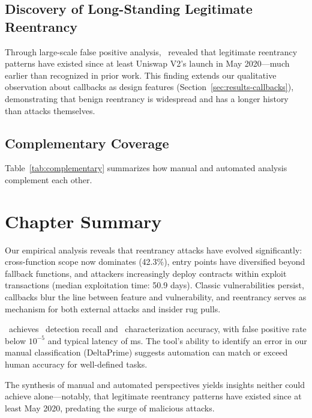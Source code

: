 \subsection{Discovery of Long-Standing Legitimate Reentrancy}

Through large-scale false positive analysis, \ToolName\ revealed that legitimate reentrancy patterns have existed since at least Uniswap V2's launch in May 2020---much earlier than recognized in prior work. This finding extends our qualitative observation about callbacks as design features (Section~\ref{sec:results-callbacks}), demonstrating that benign reentrancy is widespread and has a longer history than attacks themselves.

\subsection{Complementary Coverage}

Table~\ref{tab:complementary} summarizes how manual and automated analysis complement each other.



\section{Chapter Summary}
\label{sec:results-summary}

Our empirical analysis reveals that reentrancy attacks have evolved significantly: cross-function scope now dominates (42.3\%), entry points have diversified beyond fallback functions, and attackers increasingly deploy contracts within exploit transactions (median exploitation time: 50.9 days). Classic vulnerabilities persist, callbacks blur the line between feature and vulnerability, and reentrancy serves as mechanism for both external attacks and insider rug pulls.

\ToolName\ achieves \FirstRecall\ detection recall and \FirstCategorizationRecall\ characterization accuracy, with false positive rate below $10^{-5}$ and typical latency of  ms. The tool's ability to identify an error in our manual classification (DeltaPrime) suggests automation can match or exceed human accuracy for well-defined tasks.

The synthesis of manual and automated perspectives yields insights neither could achieve alone---notably, that legitimate reentrancy patterns have existed since at least May 2020, predating the surge of malicious attacks.
